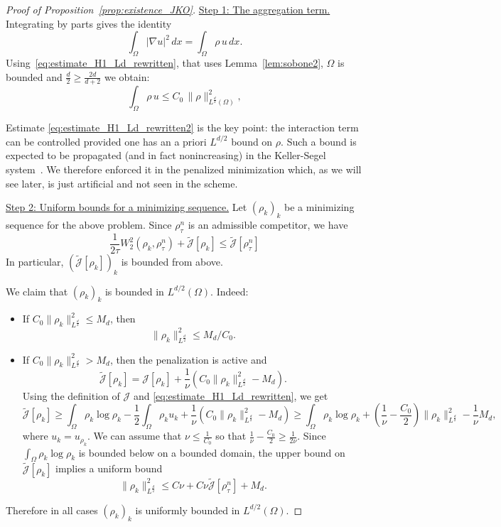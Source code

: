 \documentclass[a4paper,twosided, 11pt]{article}
\theoremstyle{plain}
\theoremstyle{remark}
\numberwithin{equation}{section}
\begin{document}
{\begin{proof}[Proof of Proposition~\ref{prop:existence_JKO}]
\medskip

\underline{Step 1: The aggregation term.}
Integrating by parts gives the identity
\[
\int_\Omega |\nabla u|^2\,dx  =  \int_\Omega \rho\,u\,dx.
\]
Using~\eqref{eq:estimate_H1_Ld_rewritten}, that uses Lemma~\ref{lem:sobone2}, $\Omega$ is bounded and $\frac d2\ge \frac{2d}{d+2}$ we obtain:
\begin{equation}\label{eq:estimate_H1_Ld_rewritten2}
\int_\Omega \rho\,u \le  C_0\,\|\rho\|_{L^{\frac d2}(\Omega)}^2,
\end{equation}


Estimate \eqref{eq:estimate_H1_Ld_rewritten2} is the key point: the interaction term can be
controlled provided one has an a priori $L^{d/2}$ bound on $\rho$.
Such a bound is expected to be
propagated (and in fact nonincreasing) in the Keller-Segel system~\cite{MR2099126}. We therefore enforced it
in the penalized minimization which, as we will  see later, is just artificial and not seen in the scheme.

\medskip



\underline{Step 2: Uniform bounds for a minimizing sequence.}
Let $(\rho_k)_k$ be a minimizing sequence for the above problem. Since $\rho_\tau^n$ is an admissible competitor, we have
\[
\frac1{2\tau}W_2^2(\rho_k,\rho_\tau^n) + \widetilde{\mathcal{J}}[\rho_k]
 \le 
\widetilde{\mathcal{J}}[\rho_\tau^n] 
\]
In particular, $(\widetilde{\mathcal{J}}[\rho_k])_k$ is bounded from above.

We claim that $(\rho_k)_k$ is bounded in $L^{d/2}(\Omega)$. Indeed:
\begin{itemize}
\item If $C_0\|\rho_k\|_{L^{\frac d2}}^2\le M_d$, then 
\begin{equation}\label{eq:JKO_Ld2_1}
 \|\rho_k\|_{L^{\frac d2}}^2\le M_d/C_0   .
\end{equation}
\item If $C_0\|\rho_k\|_{L^{\frac d2}}^2> M_d$, then the penalization is active and
\[
\widetilde{\mathcal{J}}[\rho_k]
=
\mathcal{J}[\rho_k] + \frac{1}{\nu}\left(C_0\|\rho_k\|_{L^{\frac d2}}^2 - M_d\right).
\]
Using the definition of $\mathcal{J}$ and \eqref{eq:estimate_H1_Ld_rewritten}, we get
\[
\widetilde{\mathcal{J}}[\rho_k]
 \ge 
\int_\Omega \rho_k\log\rho_k
 - \frac12\int_\Omega \rho_k u_k
 + \frac{1}{\nu}\left(C_0\|\rho_k\|_{L^{\frac d2}}^2 - M_d\right)
 \ge 
\int_\Omega \rho_k\log\rho_k
 + \left(\frac 1\nu-\frac{C_0}{2}\right)\|\rho_k\|_{L^{\frac d2}}^2 - \frac 1\nu M_d,
\]
where $u_k=u_{\rho_k}$. We can assume that $\nu\le \frac{1}{C_0}$ so that $\frac 1\nu-\frac{C_0}{2}\ge\frac{1}{2\nu}$.  Since $\int_\Omega \rho_k\log\rho_k$ is bounded below on a bounded domain, the upper bound on $\widetilde{\mathcal{J}}[\rho_k]$ implies a uniform bound 
\begin{equation}\label{eq:JKO_Ld2_2}
\|\rho_k\|_{L^{\frac d2}}^2\le C\nu+ C\nu \widetilde{\mathcal{J}}[\rho_\tau^n]+ M_d.
\end{equation}
\end{itemize}
Therefore in all cases $(\rho_k)_k$ is uniformly bounded in $L^{d/2}(\Omega)$.


\end{proof}}
\end{document}
